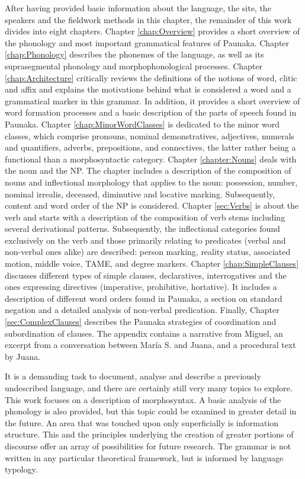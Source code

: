 After having provided basic information about the language, the site, the speakers and the fieldwork methods in this chapter, the remainder of this work divides into eight chapters. Chapter \ref{chap:Overview} provides a short overview of the phonology and most important grammatical features of Paunaka. Chapter \ref{chap:Phonology} describes the phonemes of the language, as well as its suprasegmental phonology and morphophonological processes. Chapter \ref{chap:Architecture} critically reviews the definitions of the notions of word, clitic and affix and explains the motivations behind what is considered a word and a grammatical marker in this grammar. In addition, it provides a short overview of word formation processes and a basic description of the parts of speech found in Paunaka. Chapter \ref{chap:MinorWordClasses} is dedicated to the minor word classes, which comprise pronouns, nominal demonstratives, adjectives, numerals and quantifiers, adverbs, prepositions, and connectives, the latter rather being a functional than a morphosyntactic category. Chapter \ref{chapter:Nouns} deals with the noun and the NP. The chapter includes a description of the composition of nouns and inflectional morphology that applies to the noun: possession, number, nominal irrealis, deceased, diminutive and locative marking. Subsequently, content and word order of the NP is considered. Chapter \ref{sec:Verbs} is about the verb and starts with a description of the composition of verb stems including several derivational patterns. Subsequently, the inflectional categories found exclusively on the verb and those primarily relating to predicates (verbal and non-verbal ones alike) are described: person marking, reality status, associated motion, middle voice, TAME, and degree markers. Chapter \ref{chap:SimpleClauses} discusses different types of simple clauses, declaratives, interrogatives and the ones expressing directives (imperative, prohibitive, hortative). It includes a description of different word orders found in Paunaka, a section on standard negation and a detailed analysis of non-verbal predication. Finally, Chapter \ref{sec:ComplexClauses} describes the Paunaka strategies of coordination and subordination of clauses. The appendix contains a narrative from Miguel, an excerpt from a conversation between María S. and Juana, and a procedural text by Juana.

It is a demanding task to document, analyse and describe a previously undescribed language, and there are certainly still very many topics to explore. This work focuses on a description of morphosyntax. A basic analysis of the phonology is also provided, but this topic could be examined in greater detail in the future. An area that was touched upon only superficially is information structure. This and the principles underlying the creation of greater portions of discourse offer an array of possibilities for future research. The grammar is not written in any particular theoretical framework, but is informed by language typology.

